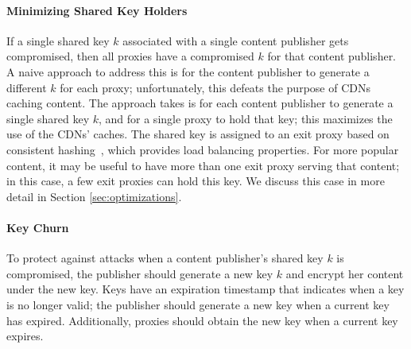 \paragraph{Minimizing Shared Key Holders} If a single shared key $k$ associated with a single content publisher gets 
compromised, then all proxies have a compromised $k$ for that content publisher.  A naive approach to address this 
is for the content publisher to generate a different $k$ for each proxy; unfortunately, this defeats the purpose of 
CDNs caching content.  The approach \system{} takes is for each content publisher to generate a single shared key $k$, 
and for a single proxy to hold that key; this maximizes the use of the CDNs' caches.  The shared key is assigned 
to an exit proxy based on consistent hashing~\cite{karger1997consistent,lewin1998consistent}, which provides load balancing properties. 
 For more popular 
content, it may be useful to have more than one exit proxy serving that content; in this case, a few exit proxies can 
hold this key.  We discuss this case in more detail in Section \ref{sec:optimizations}.

\paragraph{Key Churn} To protect against attacks when a content publisher's shared key $k$ is compromised, the publisher
should generate a new key $k$ and encrypt her content under the new key.  Keys have an expiration timestamp that indicates 
when a key is no longer valid; the publisher should generate a new key when a current key has expired.  Additionally, 
proxies should obtain the new key when a current key expires.  

